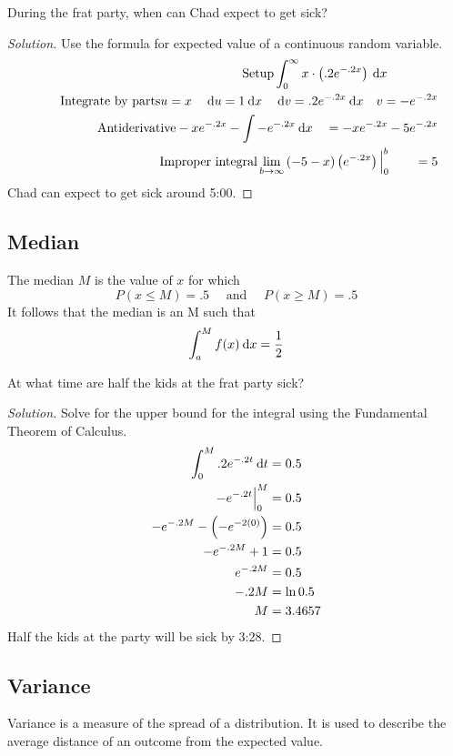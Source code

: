 \documentclass[11pt,leqno,letterpaper]{article}
\begin{document}
\begin{mdframed}
\begin{problem}
During the frat party, when can Chad expect to get sick?
\begin{proof}[Solution]
Use the formula for expected value of a continuous random variable.
\begin{align*}
\tag*{Setup}
\int_0^\infty x\cdot \left(.2e^{-.2x}\right)\:\mathrm{d}x \qquad \qquad \\
\tag*{Integrate by parts}
u=x \quad \:\mathrm{d}u = 1\:\mathrm{d}x \quad \:\mathrm{d}v = .2e^{-.2x}\:\mathrm{d}x \quad v = -e^{-.2x} \\
\tag*{Antiderivative}
-xe^{-.2x} - \int -e^{-.2x}\:\mathrm{d}x \quad = -xe^{-.2x} -5e^{-.2x} \\
\tag*{Improper integral}
\lim_{b\to \infty}\left(-5-x\right)\left(e^{-.2x}\right)\Big|_0^b
\qquad = 5
\end{align*}
Chad can expect to get sick around 5:00\AM{}.
\end{proof}
\end{problem}
\end{mdframed}
\subsection{Median}
The median $M$ is the value of $x$ for which
\[
P(x\leq M) = .5 \quad \text{ and } \quad P(x\geq M) = .5
\]
It follows that the median is an M such that
\[
\int_a^M f(x) \:\mathrm{d}x = \frac{1}{2}
\]
\begin{mdframed}
\begin{problem}
At what time are half the kids at the frat party sick?
\begin{proof}[Solution]
Solve for the upper bound for the integral using
the Fundamental Theorem of Calculus.
\begin{align*}
\int_0^M .2e^{-.2t}\:\mathrm{d}t &= 0.5 \\
-e^{-.2t}\Big|_0^M &= 0.5 \\
-e^{-.2M}-\left(-e^{-2(0)}\right) &= 0.5 \\
-e^{-.2M} +1 &= 0.5 \\
e^{-.2M} &= 0.5 \\
-.2M &= \ln 0.5 \\
M &= 3.4657
\end{align*}
Half the kids at the party will be sick by 3:28\AM{}.
\end{proof}
\end{problem}
\end{mdframed}
\subsection{Variance}
Variance is a measure of the spread of a distribution.
It is used to describe the average distance of an outcome
from the expected value.
\end{document}
